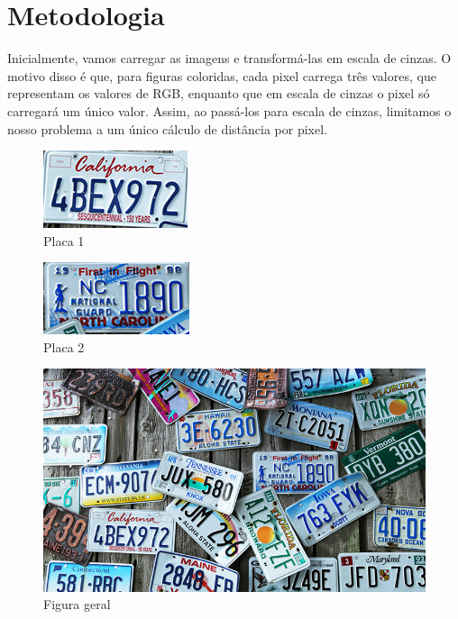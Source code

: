 \documentclass[12pt]{article}
\begin{document}
\section{Metodologia}
  \par Inicialmente, vamos carregar as imagens e transformá-las em escala de cinzas. O motivo disso é que, para figuras coloridas, cada pixel carrega três valores, que representam os valores de RGB, enquanto que em escala de cinzas o pixel só carregará um único valor. Assim, ao passá-los para escala de cinzas, limitamos o nosso problema a um único cálculo de distância por pixel.
  
  \begin{figure}[h]
   \centering
   \includegraphics[width=0.4\linewidth]{placa_1.jpg}
   \caption{Placa 1}
   \label{1}
  \end{figure}
  
  \begin{figure}[h]
   \centering
   \includegraphics[width=0.4\linewidth]{placa_2.jpg}
   \caption{Placa 2}
   \label{2}
  \end{figure}
  
  \begin{figure}[h]
   \centering
   \includegraphics[width=0.7\linewidth]{placas.jpg}
   \caption{Figura geral}
   \label{3}
  \end{figure}
\end{document}
